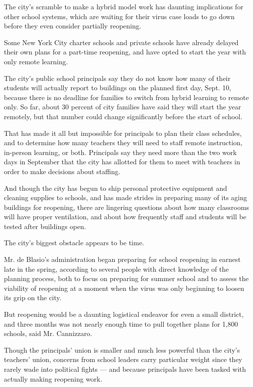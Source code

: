 The city's scramble to make a hybrid model work has daunting
implications for other school systems, which are waiting for their virus
case loads to go down before they even consider partially reopening.

Some New York City charter schools and private schools have already
delayed their own plans for a part-time reopening, and have opted to
start the year with only remote learning.

The city's public school principals say they do not know how many of
their students will actually report to buildings on the planned first
day, Sept. 10, because there is no deadline for families to switch from
hybrid learning to remote only. So far, about 30 percent of city
families have said they will start the year remotely, but that number
could change significantly before the start of school.

That has made it all but impossible for principals to plan their class
schedules, and to determine how many teachers they will need to staff
remote instruction, in-person learning, or both. Principals say they
need more than the two work days in September that the city has allotted
for them to meet with teachers in order to make decisions about
staffing.

And though the city has begun to ship personal protective equipment and
cleaning supplies to schools, and has made strides in preparing many of
its aging buildings for reopening, there are lingering questions about
how many classrooms will have proper ventilation, and about how
frequently staff and students will be tested after buildings open.

The city's biggest obstacle appears to be time.

Mr. de Blasio's administration began preparing for school reopening in
earnest late in the spring, according to several people with direct
knowledge of the planning process, both to focus on preparing for summer
school and to assess the viability of reopening at a moment when the
virus was only beginning to loosen its grip on the city.

But reopening would be a daunting logistical endeavor for even a small
district, and three months was not nearly enough time to pull together
plans for 1,800 schools, said Mr. Cannizzaro.

Though the principals' union is smaller and much less powerful than the
city's teachers' union, concerns from school leaders carry particular
weight since they rarely wade into political fights --- and because
principals have been tasked with actually making reopening work.

